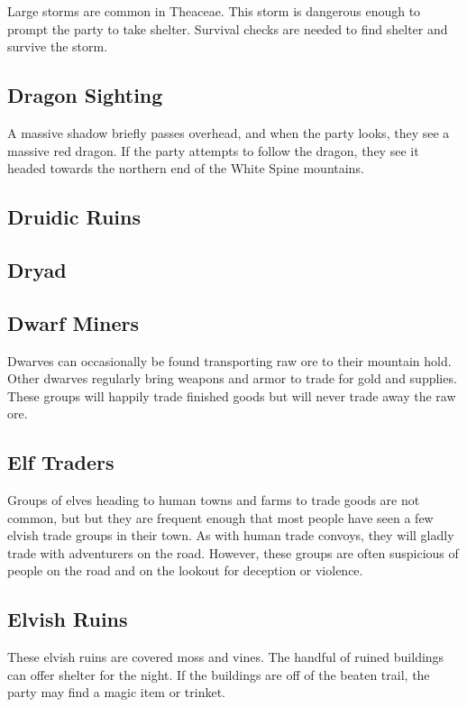 Large storms are common in Theaceae.
This storm is dangerous enough to prompt the party to take shelter.
Survival checks are needed to find shelter and survive the storm.

\subsection{Dragon Sighting}

A massive shadow briefly passes overhead, and when the party looks, they see a massive red dragon.
If the party attempts to follow the dragon, they see it headed towards the northern end of the White Spine mountains.

\subsection{Druidic Ruins}

\subsection{Dryad}

\subsection{Dwarf Miners}

Dwarves can occasionally be found transporting raw ore to their mountain hold.
Other dwarves regularly bring weapons and armor to trade for gold and supplies.
These groups will happily trade finished goods but will never trade away the raw ore.

\subsection{Elf Traders}

Groups of elves heading to human towns and farms to trade goods are not common, but but they are frequent enough that most people have seen a few elvish trade groups in their town.
As with human trade convoys, they will gladly trade with adventurers on the road.
However, these groups are often suspicious of people on the road and on the lookout for deception or violence.

\subsection{Elvish Ruins}

These elvish ruins are covered moss and vines.
The handful of ruined buildings can offer shelter for the night.
If the buildings are off of the beaten trail, the party may find a magic item or trinket.

